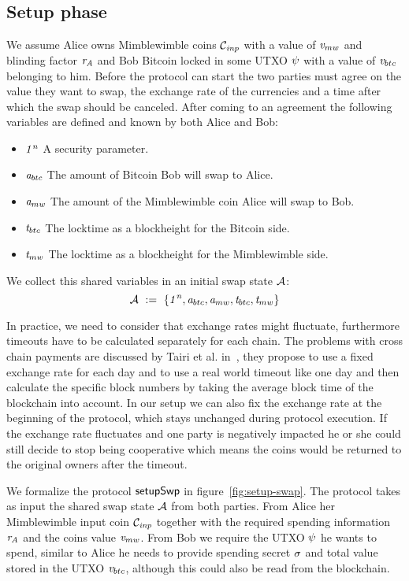 \subsection{Setup phase}\label{subsec:atom:setup}

We assume Alice owns Mimblewimble coins $\mathcal{C}_{\mathit{inp}}$ with a value of $\mathit{v}_{mw}$ and blinding factor $\mathit{r}_{\mathit{A}}$ and Bob
Bitcoin locked in some UTXO $\psi$ with a value of $\mathit{v}_{btc}$ belonging to him.
Before the protocol can start the two parties must agree on the value they want to swap, the exchange rate of the currencies and a time after which the swap should be canceled.
After coming to an agreement the following variables are defined and known by both Alice and Bob:
\begin{itemize}
    \item $\mathit{1^n}$ A security parameter.
    \item $\mathit{a}_{btc}$ The amount of Bitcoin Bob will swap to Alice.
    \item $\mathit{a}_{mw}$ The amount of the Mimblewimble coin Alice will swap to Bob.
    \item $\mathit{t}_{btc}$ The locktime as a blockheight for the Bitcoin side.
    \item $\mathit{t}_{mw}$ The locktime as a blockheight for the Mimblewimble side.
\end{itemize}
We collect this shared variables in an initial swap state $\mathcal{A}$:
\[ \mathcal{A} ~:=~ \{ \mathit{1^n}, \mathit{a}_{btc}, \mathit{a}_{mw}, \mathit{t}_{btc}, \mathit{t}_{mw} \} \]

In practice, we need to consider that exchange rates might fluctuate, furthermore timeouts have to be calculated separately for each chain.
The problems with cross chain payments are discussed by Tairi et al. in~\cite{tairi2019a2l}, they propose to use a fixed exchange rate for each day and to use a real world timeout like one day and then calculate the specific block numbers by taking the average block time of the blockchain into account.
In our setup we can also fix the exchange rate at the beginning of the protocol, which stays unchanged during protocol execution.
If the exchange rate fluctuates and one party is negatively impacted he or she could still decide to stop being cooperative which means the coins would be returned to the original owners after the timeout.

We formalize the protocol $\mathsf{setupSwp}$ in figure~\ref{fig:setup-swap}.
The protocol takes as input the shared swap state $\mathcal{A}$ from both parties.
From Alice her Mimblewimble input coin $\mathcal{C}_{\mathit{inp}}$ together with the required spending information $\mathit{r}_{\mathit{A}}$ and the coins value $\mathit{v}_{mw}$.
From Bob we require the UTXO $\psi$ he wants to spend, similar to Alice he needs to provide spending secret $\mathit{\sigma}$ and total value stored in the UTXO $\mathit{v}_{btc}$, although this could also be read from the blockchain.


